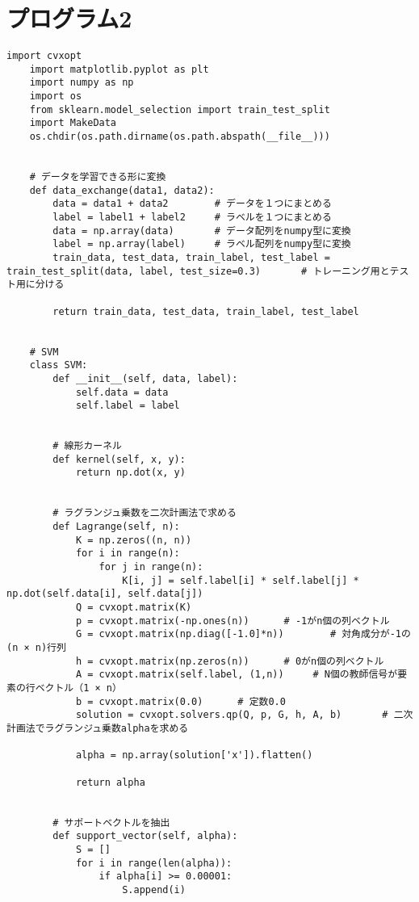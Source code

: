 \section{プログラム2}
\begin{lstlisting}[caption=課題1におけるSVM学習用プログラム]
    import cvxopt
    import matplotlib.pyplot as plt
    import numpy as np
    import os
    from sklearn.model_selection import train_test_split
    import MakeData
    os.chdir(os.path.dirname(os.path.abspath(__file__)))


    # データを学習できる形に変換
    def data_exchange(data1, data2):
        data = data1 + data2        # データを１つにまとめる
        label = label1 + label2     # ラベルを１つにまとめる
        data = np.array(data)       # データ配列をnumpy型に変換
        label = np.array(label)     # ラベル配列をnumpy型に変換
        train_data, test_data, train_label, test_label = train_test_split(data, label, test_size=0.3)       # トレーニング用とテスト用に分ける

        return train_data, test_data, train_label, test_label


    # SVM
    class SVM:
        def __init__(self, data, label):
            self.data = data
            self.label = label
        

        # 線形カーネル
        def kernel(self, x, y):
            return np.dot(x, y)


        # ラグランジュ乗数を二次計画法で求める
        def Lagrange(self, n):
            K = np.zeros((n, n))
            for i in range(n):
                for j in range(n):
                    K[i, j] = self.label[i] * self.label[j] * np.dot(self.data[i], self.data[j])
            Q = cvxopt.matrix(K)
            p = cvxopt.matrix(-np.ones(n))      # -1がn個の列ベクトル
            G = cvxopt.matrix(np.diag([-1.0]*n))        # 対角成分が-1の(n × n)行列
            h = cvxopt.matrix(np.zeros(n))      # 0がn個の列ベクトル
            A = cvxopt.matrix(self.label, (1,n))     # N個の教師信号が要素の行ベクトル（1 × n）
            b = cvxopt.matrix(0.0)      # 定数0.0
            solution = cvxopt.solvers.qp(Q, p, G, h, A, b)       # 二次計画法でラグランジュ乗数alphaを求める

            alpha = np.array(solution['x']).flatten()

            return alpha


        # サポートベクトルを抽出
        def support_vector(self, alpha):
            S = []
            for i in range(len(alpha)):
                if alpha[i] >= 0.00001:
                    S.append(i)
            

\end{lstlisting}
